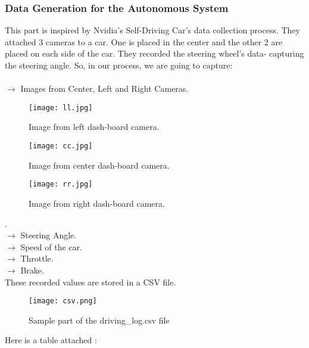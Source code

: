 \subsubsection{Data Generation for the Autonomous System}
This part is inspired by Nvidia’s Self-Driving Car’s data collection process. They attached 3 cameras to a car. One is placed in the center and the other 2 are placed on each side of the car. They recorded the steering wheel’s data- capturing the steering angle. So, in our process, we are going to capture:\\\\
$\to$ Images from Center, Left and Right Cameras.
\begin{figure}[H]
	\centering
	\texttt{[image: ll.jpg]}
	\caption{Image from left dash-board camera.}
\end{figure}
\begin{figure}[H]
	\centering
	\texttt{[image: cc.jpg]}
	\caption{Image from center dash-board camera.}
\end{figure}
\begin{figure}[H]
	\centering
	\texttt{[image: rr.jpg]}
	\caption{Image from right dash-board camera.}
\end{figure}
.\\
$\to$ Steering Angle.\\
$\to$ Speed of the car.\\
$\to$ Throttle.\\
$\to$ Brake.\\
These recorded values are stored in a CSV file.
\begin{figure}[H]
	\centering
	\texttt{[image: csv.png]}
	\caption{Sample part of the driving\_log.csv file}
\end{figure}
Here is a table attached :
